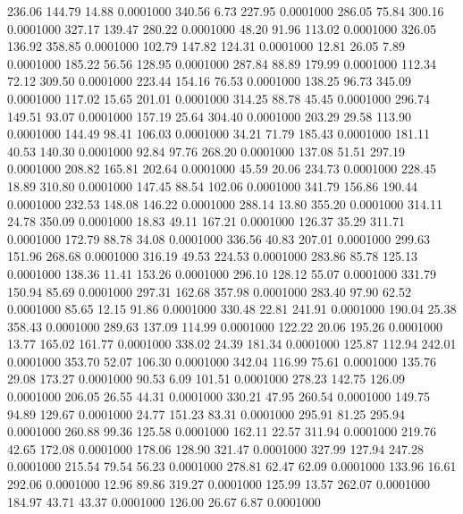  236.06  144.79   14.88   0.0001000
 340.56    6.73  227.95   0.0001000
 286.05   75.84  300.16   0.0001000
 327.17  139.47  280.22   0.0001000
  48.20   91.96  113.02   0.0001000
 326.05  136.92  358.85   0.0001000
 102.79  147.82  124.31   0.0001000
  12.81   26.05    7.89   0.0001000
 185.22   56.56  128.95   0.0001000
 287.84   88.89  179.99   0.0001000
 112.34   72.12  309.50   0.0001000
 223.44  154.16   76.53   0.0001000
 138.25   96.73  345.09   0.0001000
 117.02   15.65  201.01   0.0001000
 314.25   88.78   45.45   0.0001000
 296.74  149.51   93.07   0.0001000
 157.19   25.64  304.40   0.0001000
 203.29   29.58  113.90   0.0001000
 144.49   98.41  106.03   0.0001000
  34.21   71.79  185.43   0.0001000
 181.11   40.53  140.30   0.0001000
  92.84   97.76  268.20   0.0001000
 137.08   51.51  297.19   0.0001000
 208.82  165.81  202.64   0.0001000
  45.59   20.06  234.73   0.0001000
 228.45   18.89  310.80   0.0001000
 147.45   88.54  102.06   0.0001000
 341.79  156.86  190.44   0.0001000
 232.53  148.08  146.22   0.0001000
 288.14   13.80  355.20   0.0001000
 314.11   24.78  350.09   0.0001000
  18.83   49.11  167.21   0.0001000
 126.37   35.29  311.71   0.0001000
 172.79   88.78   34.08   0.0001000
 336.56   40.83  207.01   0.0001000
 299.63  151.96  268.68   0.0001000
 316.19   49.53  224.53   0.0001000
 283.86   85.78  125.13   0.0001000
 138.36   11.41  153.26   0.0001000
 296.10  128.12   55.07   0.0001000
 331.79  150.94   85.69   0.0001000
 297.31  162.68  357.98   0.0001000
 283.40   97.90   62.52   0.0001000
  85.65   12.15   91.86   0.0001000
 330.48   22.81  241.91   0.0001000
 190.04   25.38  358.43   0.0001000
 289.63  137.09  114.99   0.0001000
 122.22   20.06  195.26   0.0001000
  13.77  165.02  161.77   0.0001000
 338.02   24.39  181.34   0.0001000
 125.87  112.94  242.01   0.0001000
 353.70   52.07  106.30   0.0001000
 342.04  116.99   75.61   0.0001000
 135.76   29.08  173.27   0.0001000
  90.53    6.09  101.51   0.0001000
 278.23  142.75  126.09   0.0001000
 206.05   26.55   44.31   0.0001000
 330.21   47.95  260.54   0.0001000
 149.75   94.89  129.67   0.0001000
  24.77  151.23   83.31   0.0001000
 295.91   81.25  295.94   0.0001000
 260.88   99.36  125.58   0.0001000
 162.11   22.57  311.94   0.0001000
 219.76   42.65  172.08   0.0001000
 178.06  128.90  321.47   0.0001000
 327.99  127.94  247.28   0.0001000
 215.54   79.54   56.23   0.0001000
 278.81   62.47   62.09   0.0001000
 133.96   16.61  292.06   0.0001000
  12.96   89.86  319.27   0.0001000
 125.99   13.57  262.07   0.0001000
 184.97   43.71   43.37   0.0001000
 126.00   26.67    6.87   0.0001000
